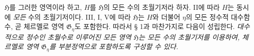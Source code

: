 
$\mathfrak H$를 그러한 영역이라 하고, $H$를 $\mathfrak H$의 모든 수의 초월기저라 하자. II에 따라 $H$는 동시에 \emph{모든} 수의 초월기저이다. III, I, V에 따라 $\mathfrak H$는 $H$와 더불어 $\eta$의 모든 정수적 대수함수, 곧 체르멜로 영역 $\mathfrak G_\eta$도 포함한다. 따라서 § 1과 마찬가지로 다음이 성립한다. \emph{대수적으로 정수인 초월수로 이루어진 모든 영역 $\mathfrak H$는 모든 수의 초월기저를 이용하여, 체르멜로 영역 $\mathfrak G_\eta$를 부분정역으로 포함하도록 구성할 수 있다.}
